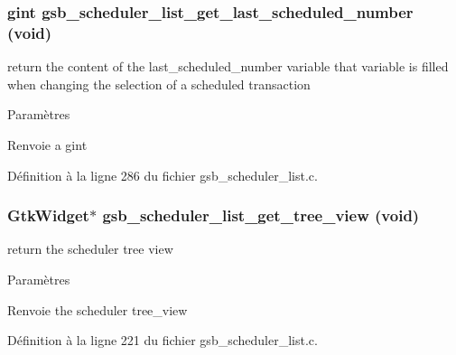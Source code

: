 \subsubsection[{gsb\_\-scheduler\_\-list\_\-get\_\-last\_\-scheduled\_\-number}]{\setlength{\rightskip}{0pt plus 5cm}gint gsb\_\-scheduler\_\-list\_\-get\_\-last\_\-scheduled\_\-number (void)}\label{gsb__scheduler__list_8h_ae3d3fe09b37dc577b1b3f4564da0572a}
return the content of the last\_\-scheduled\_\-number variable that variable is filled when changing the selection of a scheduled transaction


\begin{DoxyParams}{Paramètres}
\item[{\em }]\end{DoxyParams}
\begin{DoxyReturn}{Renvoie}
a gint 
\end{DoxyReturn}


Définition à la ligne 286 du fichier gsb\_\-scheduler\_\-list.c.

\subsubsection[{gsb\_\-scheduler\_\-list\_\-get\_\-tree\_\-view}]{\setlength{\rightskip}{0pt plus 5cm}GtkWidget$\ast$ gsb\_\-scheduler\_\-list\_\-get\_\-tree\_\-view (void)}\label{gsb__scheduler__list_8h_a672312ea4cd0c1237b5a8312c330aaef}
return the scheduler tree view


\begin{DoxyParams}{Paramètres}
\item[{\em }]\end{DoxyParams}
\begin{DoxyReturn}{Renvoie}
the scheduler tree\_\-view 
\end{DoxyReturn}


Définition à la ligne 221 du fichier gsb\_\-scheduler\_\-list.c.

